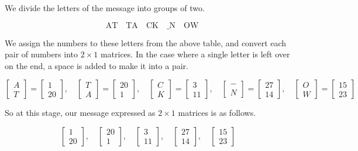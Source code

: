 \begin{solution}
    We divide the letters of the message into groups of two.

    \[
        \text{AT} \quad \text{TA} \quad \text{CK} \quad \text{\_N} \quad \text{OW}
    \]

    We assign the numbers to these letters from the above table, and convert each pair of numbers into \( 2 \times 1 \) matrices. In the case where a single letter is left over on the end, a space is added to make it into a pair.

    \[
        \begin{bmatrix} A \\ T \end{bmatrix} = \begin{bmatrix} 1 \\ 20 \end{bmatrix}, \quad
        \begin{bmatrix} T \\ A \end{bmatrix} = \begin{bmatrix} 20 \\ 1 \end{bmatrix}, \quad
        \begin{bmatrix} C \\ K \end{bmatrix} = \begin{bmatrix} 3 \\ 11 \end{bmatrix}, \quad
        \begin{bmatrix} - \\ N \end{bmatrix} = \begin{bmatrix} 27 \\ 14 \end{bmatrix}, \quad
        \begin{bmatrix} O \\ W \end{bmatrix} = \begin{bmatrix} 15 \\ 23 \end{bmatrix}
    \]

    So at this stage, our message expressed as \( 2 \times 1 \) matrices is as follows.

    \[
        \begin{bmatrix} 1 \\ 20 \end{bmatrix}, \quad
        \begin{bmatrix} 20 \\ 1 \end{bmatrix}, \quad
        \begin{bmatrix} 3 \\ 11 \end{bmatrix}, \quad
        \begin{bmatrix} 27 \\ 14 \end{bmatrix}, \quad
        \begin{bmatrix} 15 \\ 23 \end{bmatrix} \quad
    \]


\end{solution}
